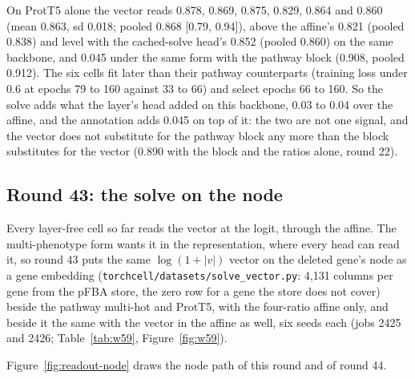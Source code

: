 On ProtT5 alone the vector reads 0.878, 0.869, 0.875, 0.829, 0.864 and 0.860 (mean
0.863, sd 0.018; pooled 0.868 [0.79, 0.94]), above the affine's 0.821 (pooled 0.838)
and level with the cached-solve head's 0.852 (pooled 0.860) on the same backbone, and
0.045 under the same form with the pathway block (0.908, pooled 0.912). The six cells
fit later than their pathway counterparts (training loss under 0.6 at epochs 79 to
160 against 33 to 66) and select epochs 66 to 160. So the solve adds what the layer's
head added on this backbone, 0.03 to 0.04 over the affine, and the annotation adds
0.045 on top of it: the two are not one signal, and the vector does not substitute
for the pathway block any more than the block substitutes for the vector (0.890 with
the block and the ratios alone, round 22).

\subsection{Round 43: the solve on the node}
\label{sec:round43}

Every layer-free cell so far reads the vector at the logit, through the affine. The
multi-phenotype form wants it in the representation, where every head can read it, so
round 43 puts the same $\log(1 + |v|)$ vector on the deleted gene's node as a gene
embedding (\texttt{torchcell/datasets/solve\_vector.py}: 4,131 columns per gene from
the pFBA store, the zero row for a gene the store does not cover) beside the pathway
multi-hot and ProtT5, with the four-ratio affine only, and beside it the same with the
vector in the affine as well, six seeds each (jobs 2425 and 2426; Table~\ref{tab:w59},
Figure~\ref{fig:w59}).

Figure~\ref{fig:readout-node} draws the node path of this round and of round 44.





